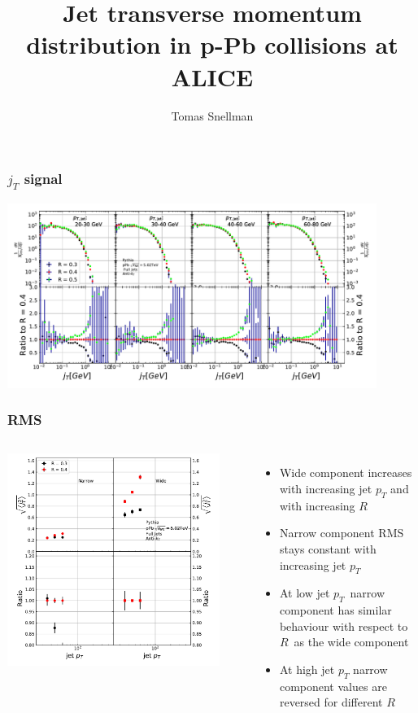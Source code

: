 \documentclass{beamer}
\title[Jet $j_{T}$]{Jet transverse momentum distribution in p-Pb collisions at ALICE}
\author{Tomas Snellman} %
\institute{University of Jyv\"askyl\"a, Helsinki Institute of Physics}%
\begin{document}
\begin{frame}
\frametitle{$j_T$ signal}
\includegraphics[width=0.90\textwidth]{RcomparisonSignal.pdf} 
\end{frame}

\begin{frame}
\frametitle{RMS}
\begin{columns}
\includegraphics[width=0.90\textwidth]{RcomparisonRMS.pdf} 
\begin{itemize}
\item Wide component increases with increasing jet $p_T$ and with increasing $R$ 
\item Narrow component RMS stays constant with increasing jet $p_T$
\item At low jet $p_T$ narrow component has similar behaviour with respect to $R$ as the wide component
\item At high jet $p_T$ narrow component values are reversed for different $R$
\end{itemize}
\end{columns}
\end{frame}
\end{document}
